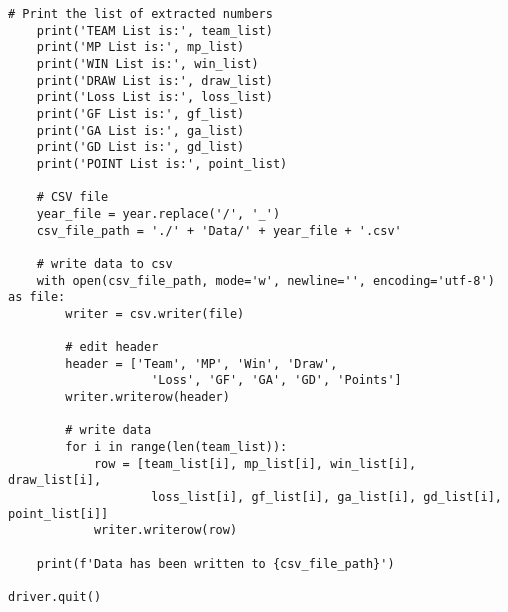 \begin{lstlisting}[style=pystyle]
    # Print the list of extracted numbers
    print('TEAM List is:', team_list)
    print('MP List is:', mp_list)
    print('WIN List is:', win_list)
    print('DRAW List is:', draw_list)
    print('Loss List is:', loss_list)
    print('GF List is:', gf_list)
    print('GA List is:', ga_list)
    print('GD List is:', gd_list)
    print('POINT List is:', point_list)

    # CSV file
    year_file = year.replace('/', '_')
    csv_file_path = './' + 'Data/' + year_file + '.csv'

    # write data to csv
    with open(csv_file_path, mode='w', newline='', encoding='utf-8') as file:
        writer = csv.writer(file)

        # edit header
        header = ['Team', 'MP', 'Win', 'Draw',
                    'Loss', 'GF', 'GA', 'GD', 'Points']
        writer.writerow(header)

        # write data
        for i in range(len(team_list)):
            row = [team_list[i], mp_list[i], win_list[i], draw_list[i],
                    loss_list[i], gf_list[i], ga_list[i], gd_list[i], point_list[i]]
            writer.writerow(row)

    print(f'Data has been written to {csv_file_path}')

driver.quit()

\end{lstlisting}
% 
% 
% 
% 
% 
% 
% 
% 
